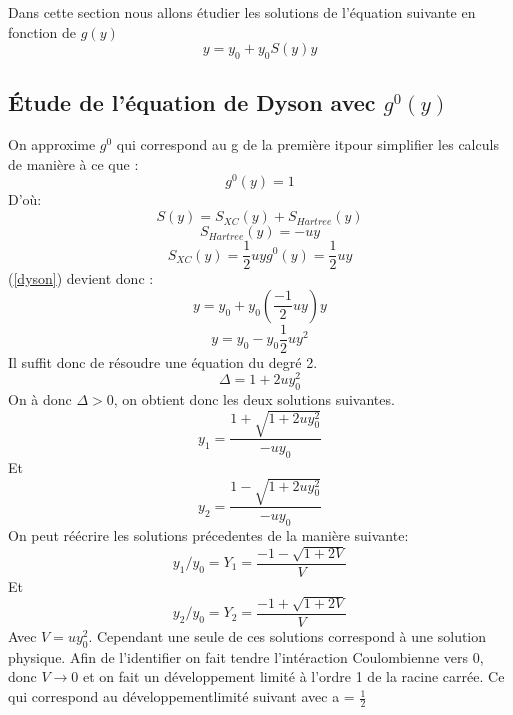 \documentclass[12pt]{article}
\begin{document}
Dans cette section nous allons \'etudier les solutions de l'\'equation suivante en fonction de $g(y)$
\begin{equation}
\label{dyson}
	y = y_0 + y_0 S(y) y
\end{equation}
\subsection{\'Etude de l'\'equation de Dyson avec $g^0(y)$}
On approxime $g^0$ qui correspond au g de la première it  pour simplifier les calculs de manière \`a ce que :
\begin{equation}
 g^0(y) = 1
\end{equation}
D'o\`u:
\begin{equation}
 S(y) = S_{XC}(y) + S_{Hartree}(y)
\end{equation}
\begin{equation}
 S_{Hartree}(y) = -uy
\end{equation}
\begin{equation}
 S_{XC}(y) = \frac{1}{2} u y g^0(y) = \frac{1}{2} u y
\end{equation}
(\ref{dyson}) devient donc :
\begin{equation}
 y = y_0 + y_0 (\frac{-1}{2} u y) y
\end{equation}
\begin{equation}
 y = y_0 - y_0 \frac{1}{2} u y^2
\end{equation}
Il suffit donc de r\'esoudre une \'equation du degr\'e 2.
\begin{equation}
 \Delta = 1 + 2 u y_0^2
\end{equation}
On \`a donc $\Delta > 0 $, on obtient donc les deux solutions suivantes.
\begin{equation}
 y_1 = \frac{1 + \sqrt{1 + 2 u y_0 ^2}}{- u y_0}
\end{equation}
Et 
\begin{equation}
 y_2 = \frac{1 - \sqrt{1 + 2 u y_0^2}}{- u y_0}
\end{equation}
On peut r\'e\'ecrire les solutions pr\'ecedentes de la mani\`ere suivante:
\begin{equation}
 y_1/y_0 = Y_1 = \frac{-1-\sqrt{1 + 2 V}}{V}
\end{equation}
Et 
\begin{equation}
 y_2/y_0 = Y_2 = \frac{-1 + \sqrt{1 + 2V}}{V}
\end{equation}
Avec $V = uy_0^2$. Cependant une seule de ces solutions correspond \`a une solution physique. 
Afin de l'identifier on fait tendre l'int\'eraction Coulombienne vers 0, donc $V\rightarrow 0$ et on fait un d\'eveloppement limit\'e \`a l'ordre 1 de la racine carr\'ee. Ce qui correspond au d\'eveloppementlimit\'e suivant avec a = $\frac{1}{2}$
\end{document}
